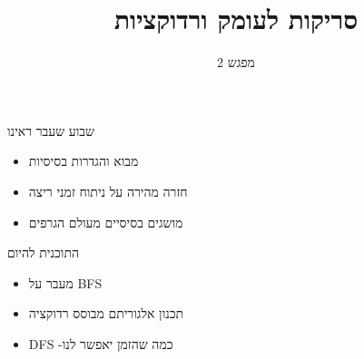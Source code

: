 \documentclass[luatex]{beamer}
\begin{document}
	\title{ סריקות לעומק ורדוקציות}
	\subtitle{מפגש 2}
	\date{}
	
	
	\maketitle
\begin{frame}{שבוע שעבר ראינו}
\pause
\begin{itemize}[<+->]
	\item מבוא והגדרות בסיסיות 
	\item חזרה מהירה על ניתוח זמני ריצה
	\item מושגים בסיסיים מעולם הגרפים
\end{itemize}
\end{frame}

\begin{frame}{התוכנית להיום}
\pause
\begin{itemize}[<+->]
	\item מעבר על BFS
	\item תכנון אלגוריתם מבוסס רדוקציה
	\item  DFS  -כמה שהזמן יאפשר לנו 
\end{itemize}
\end{frame}
\end{document}
